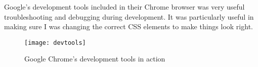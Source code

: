 Google's development tools included in their Chrome browser was very useful troubleshooting and debugging during development. It was particularly useful in making sure I was changing the correct CSS elements to make things look right.

\begin{figure}[H]
\begin{center}
\texttt{[image: devtools]}
\label{fig:devtoolsf}
\caption{Google Chrome's development tools in action}
\end{center}
\end{figure}